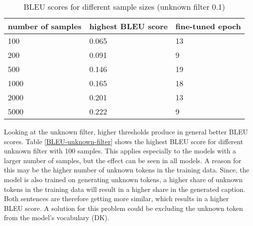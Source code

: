 \documentclass[11pt]{article}
\begin{document}
\begin{table}[h]
    \begin{center}
        \begin{tabular}{|p{2cm}|p{2cm}|p{2cm}|}
            \hline \bf number of samples & \bf highest BLEU score & \bf fine-tuned epoch \\ \hline
            100                          & 0.065                  & 13                   \\
            200                          & 0.091                  & 9                    \\
            500                          & 0.146                  & 19                   \\
            1000                         & 0.165                  & 18                   \\
            2000                         & 0.201                  & 13                   \\
            5000                         & 0.222                  & 9                    \\
            \hline
        \end{tabular}
    \end{center}
    \caption{\label{BLEU-sample-sizes} BLEU scores for different sample sizes (unknown filter 0.1) }
\end{table}

Looking at the unknown filter, higher thresholds produce in general better BLEU scores. Table \ref{BLEU-unknown-filter} shows the highest BLEU score for different unknown filter with 100 samples. This applies especially to the models with a larger number of samples, but the effect can be seen in all models. A reason for this may be the higher number of unknown tokens in the training data. Since, the model is also trained on generating unknown tokens, a higher share of unknown tokens in the training data will result in a higher share in the generated caption. Both sentences are therefore getting more similar, which results in a higher BLEU score. A solution for this problem could be excluding the unknown token from the model's vocabulary (DK).
\end{document}
